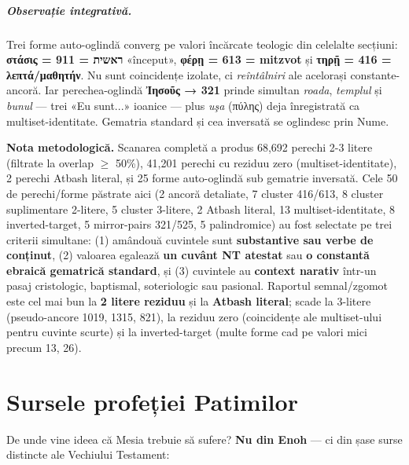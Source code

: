 \documentclass[12pt,a4paper,twoside,openany]{book}
\begin{document}
\paragraph*{Observație integrativă.} Trei forme auto-oglindă converg pe valori încărcate teologic din celelalte secțiuni: \textbf{στάσις = 911 = ראשית} «început», \textbf{φέρῃ = 613 = mitzvot} și \textbf{τηρῇ = 416 = λεπτά/μαθητήν}. Nu sunt coincidențe izolate, ci \textit{reîntâlniri} ale acelorași constante-ancoră. Iar perechea-oglindă \textbf{Ἰησοῦς → 321} prinde simultan \textit{roada}, \textit{templul} și \textit{bunul} --- trei «Eu sunt...» ioanice --- plus \textit{uşa} (πύλης) deja înregistrată ca multiset-identitate. Gematria standard și cea inversată se oglindesc prin Nume.

\textbf{Nota metodologică.} Scanarea completă a produs 68{,}692 perechi 2-3 litere (filtrate la overlap $\geq$ 50\%), 41{,}201 perechi cu reziduu zero (multiset-identitate), 2 perechi Atbash literal, și 25 forme auto-oglindă sub gematrie inversată. Cele 50 de perechi/forme păstrate aici (2 ancoră detaliate, 7 cluster 416/613, 8 cluster suplimentare 2-litere, 5 cluster 3-litere, 2 Atbash literal, 13 multiset-identitate, 8 inverted-target, 5 mirror-pairs 321/525, 5 palindromice) au fost selectate pe trei criterii simultane: (1) amândouă cuvintele sunt \textbf{substantive sau verbe de conținut}, (2) valoarea egalează \textbf{un cuvânt NT atestat} sau \textbf{o constantă ebraică gematrică standard}, și (3) cuvintele au \textbf{context narativ} într-un pasaj cristologic, baptismal, soteriologic sau pasional. Raportul semnal/zgomot este cel mai bun la \textbf{2 litere reziduu} și la \textbf{Atbash literal}; scade la 3-litere (pseudo-ancore 1019, 1315, 821), la reziduu zero (coincidențe ale multiset-ului pentru cuvinte scurte) și la inverted-target (multe forme cad pe valori mici precum 13, 26).


\chapter{Sursele profeției Patimilor}\label{surse-patimi}
De unde vine ideea că Mesia trebuie să sufere? \textbf{Nu din Enoh} — ci din șase surse distincte ale Vechiului Testament:
\end{document}
